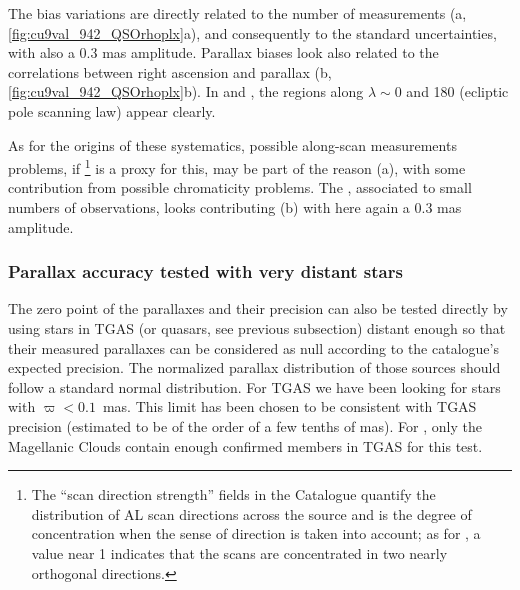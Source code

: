 The bias variations are directly related to the number of 
measurements (a, \ref{fig:cu9val_942_QSOrhoplx}a), 
and consequently to the standard uncertainties,
with also a 0.3 mas amplitude. Parallax biases look also related to the  
correlations between right ascension and parallax
(b, \ref{fig:cu9val_942_QSOrhoplx}b).
In  and , the regions along 
$\lambda\sim 0$ and 180{\deg} (ecliptic pole scanning law) appear clearly. 

As for the origins of these systematics, possible along-scan measurements 
problems, if \footnote{The 
``scan direction strength'' fields in the Catalogue quantify the 
distribution of AL scan directions across the source and  
is the degree of concentration when the sense of direction is taken into account; as for
, a value near 1 indicates that the scans are concentrated in two
nearly orthogonal directions.} 
is a proxy for this, may be part of the reason (a), 
with some contribution from possible chromaticity problems. 
The , associated to small 
numbers of observations,   looks  contributing (b) with 
here again a 0.3 mas amplitude. 


\subsubsection{Parallax accuracy tested with very distant stars}\label{sec:LMCSMC}
%
The zero point of the parallaxes and their precision can also be tested directly by using stars in TGAS (or quasars, see previous subsection) distant enough so that their measured parallaxes can be considered as null according to the catalogue's expected precision. The normalized parallax distribution of those sources should follow a standard normal distribution. For TGAS we have been looking for stars with $\varpi<0.1$~mas. This limit has been chosen to be consistent with TGAS precision (estimated to be of the order of a few tenths of mas). For , only the Magellanic Clouds contain enough confirmed members in TGAS for this test. 

